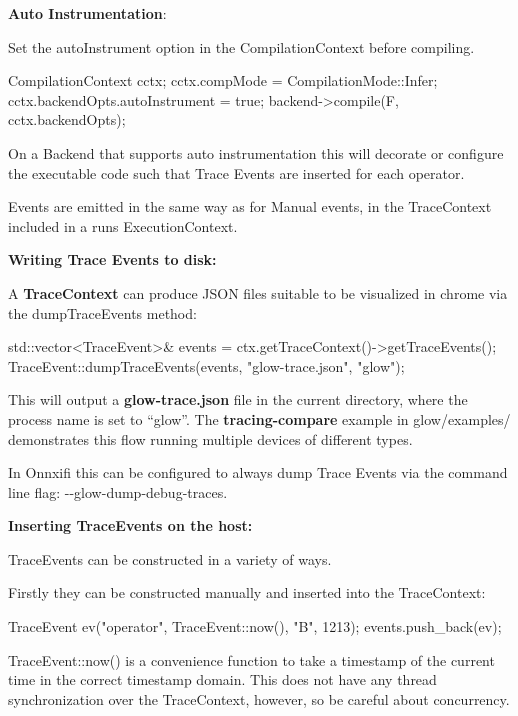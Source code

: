 {\bfseries Auto Instrumentation}\+:

Set the auto\+Instrument option in the Compilation\+Context before compiling.


\begin{DoxyCode}
CompilationContext cctx;
cctx.compMode = CompilationMode::Infer;
cctx.backendOpts.autoInstrument = true;
backend->compile(F, cctx.backendOpts);
\end{DoxyCode}


On a Backend that supports auto instrumentation this will decorate or configure the executable code such that Trace Events are inserted for each operator.

Events are emitted in the same way as for Manual events, in the Trace\+Context included in a run\textquotesingle{}s Execution\+Context.

{\bfseries Writing Trace Events to disk\+:}

A {\bfseries Trace\+Context} can produce J\+S\+ON files suitable to be visualized in chrome via the {\ttfamily dump\+Trace\+Events} method\+:


\begin{DoxyCode}
std::vector<TraceEvent>& events = ctx.getTraceContext()->getTraceEvents();
TraceEvent::dumpTraceEvents(events, "glow-trace.json", "glow");
\end{DoxyCode}


This will output a {\bfseries glow-\/trace.\+json} file in the current directory, where the process name is set to “glow”. The {\bfseries tracing-\/compare} example in {\ttfamily glow/examples/} demonstrates this flow running multiple devices of different types.

In Onnxifi this can be configured to always dump Trace Events via the command line flag\+: {\ttfamily -\/-\/glow-\/dump-\/debug-\/traces}.

{\bfseries Inserting Trace\+Events on the host\+:}

Trace\+Events can be constructed in a variety of ways.

Firstly they can be constructed manually and inserted into the Trace\+Context\+:


\begin{DoxyCode}
TraceEvent ev("operator", TraceEvent::now(), "B", 1213);
events.push\_back(ev);
\end{DoxyCode}


Trace\+Event\+::now() is a convenience function to take a timestamp of the current time in the correct timestamp domain. This does not have any thread synchronization over the Trace\+Context, however, so be careful about concurrency.

